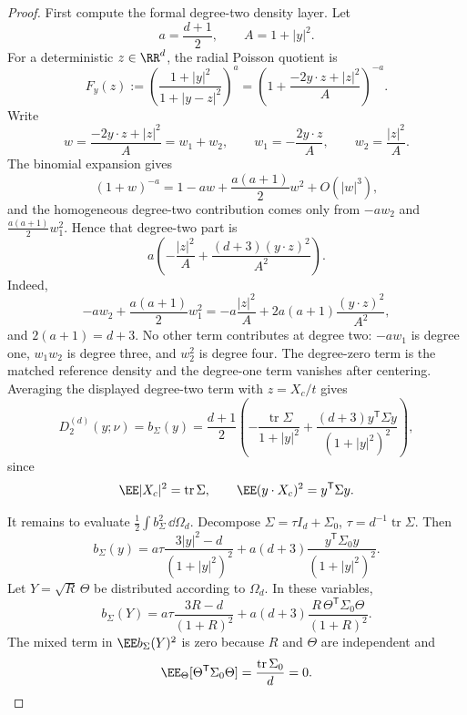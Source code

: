 \ifdefined\JFAArticleMain
{}
\else
\begin{proof}
First compute the formal degree-two density layer.  Let
\[
  a=\frac{d+1}{2},\qquad A=1+|y|^2 .
\]
For a deterministic \(z\in\RR^d\), the radial Poisson quotient is
\[
F_y(z):=
\left(\frac{1+|y|^2}{1+|y-z|^2}\right)^a
=
\left(1+\frac{-2y\cdot z+|z|^2}{A}\right)^{-a}.
\]
Write
\[
  w=\frac{-2y\cdot z+|z|^2}{A}=w_1+w_2,\qquad
  w_1=-\frac{2y\cdot z}{A},\qquad
  w_2=\frac{|z|^2}{A}.
\]
The binomial expansion gives
\[
  (1+w)^{-a}=1-aw+\frac{a(a+1)}2w^2+O(|w|^3),
\]
and the homogeneous degree-two contribution comes only from \(-aw_2\) and
\(\frac{a(a+1)}2w_1^2\).  Hence that degree-two part is
\[
a\left(-\frac{|z|^2}{A}
+\frac{(d+3)(y\cdot z)^2}{A^2}\right).
\]
Indeed,
\[
  -aw_2+\frac{a(a+1)}2w_1^2
  =
  -a\frac{|z|^2}{A}
  +2a(a+1)\frac{(y\cdot z)^2}{A^2},
\]
and \(2(a+1)=d+3\).  No other term contributes at degree two:
\(-aw_1\) is degree one, \(w_1w_2\) is degree three, and \(w_2^2\) is degree
four.  The degree-zero term is the matched reference density and the
degree-one term vanishes after centering.  Averaging the displayed
degree-two term with \(z=X_c/t\) gives
\[
  D_2^{(d)}(y;\nu)=b_\Sigma(y)=
  \frac{d+1}{2}\left(
  -\frac{\operatorname{tr}\Sigma}{1+|y|^2}
  +\frac{(d+3)y^{\mathsf T}\Sigma y}{(1+|y|^2)^2}
  \right),
\]
since
\[
\EE |X_c|^2=\operatorname{tr}\Sigma,\qquad
\EE (y\cdot X_c)^2=y^{\mathsf T}\Sigma y .
\]

It remains to evaluate \(\frac12\int b_\Sigma^2\,\dd\Omega_d\).  Decompose
\(\Sigma=\tau I_d+\Sigma_0\), \(\tau=d^{-1}\operatorname{tr}\Sigma\).  Then
\[
b_\Sigma(y)=
a\tau\frac{3|y|^2-d}{(1+|y|^2)^2}
+a(d+3)\frac{y^{\mathsf T}\Sigma_0y}{(1+|y|^2)^2}.
\]
Let \(Y=\sqrt R\,\Theta\) be distributed according to \(\Omega_d\).  In these
variables,
\[
b_\Sigma(Y)=
a\tau\frac{3R-d}{(1+R)^2}
+a(d+3)\frac{R\,\Theta^{\mathsf T}\Sigma_0\Theta}{(1+R)^2}.
\]
The mixed term in \(\EE b_\Sigma(Y)^2\) is zero because \(R\) and \(\Theta\)
are independent and
\[
\EE_\Theta[\Theta^{\mathsf T}\Sigma_0\Theta]
=\frac{\operatorname{tr}\Sigma_0}{d}=0 .
\]


\end{proof}
